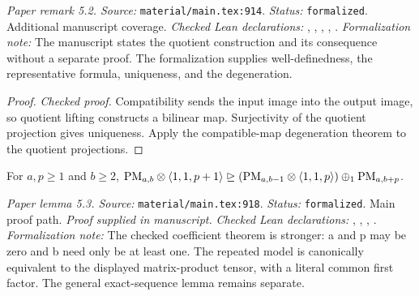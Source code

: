 \noindent\textit{Paper remark 5.2. Source:} \texttt{material/main.tex:914}.
\textit{Status:} \texttt{formalized}. Additional manuscript coverage.
\textit{Checked Lean declarations:} , , , , .
\textit{Formalization note:} The manuscript states the quotient construction and its consequence without a separate proof. The formalization supplies well-definedness, the representative formula, uniqueness, and the degeneration.

\begin{proof}
\leanok
{}
\textit{Checked proof.} Compatibility sends the input image into the output image, so quotient lifting constructs a bilinear map. Surjectivity of the quotient projection gives uniqueness. Apply the compatible-map degeneration theorem to the quotient projections.
\end{proof}

\renewcommand{\thetheorem}{5.3}
\begin{lemma}
\label{lem:pm-concavity-degeneration}
\manuscriptproof
{}
\leanok
For $a,p\ge1$ and $b\ge2$, $\mathrm{PM}_{a,b}\otimes\langle1,1,p+1\rangle\trianglerighteq(\mathrm{PM}_{a,b-1}\otimes\langle1,1,p\rangle)\mathbin{\oplus_1}\mathrm{PM}_{a,b+p}$.
\end{lemma}

\noindent\textit{Paper lemma 5.3. Source:} \texttt{material/main.tex:918}.
\textit{Status:} \texttt{formalized}. Main proof path.
\textit{Proof supplied in manuscript.}
\textit{Checked Lean declarations:} , , , .
\textit{Formalization note:} The checked coefficient theorem is stronger: a and p may be zero and b need only be at least one. The repeated model is canonically equivalent to the displayed matrix-product tensor, with a literal common first factor. The general exact-sequence lemma remains separate.

